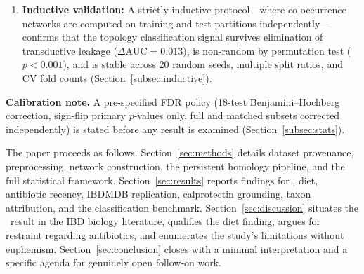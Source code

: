 \begin{enumerate}[leftmargin=*, itemsep=3pt]
  \item \textbf{Inductive validation:} A strictly inductive protocol---where
  co-occurrence networks are computed on training and test partitions
  independently---confirms that the topology classification signal survives
  elimination of transductive leakage ($\Delta\text{AUC} = 0.013$), is
  non-random by permutation test ($p < 0.001$), and is stable across 20
  random seeds, multiple split ratios, and CV fold counts
  (Section~\ref{subsec:inductive}).
\end{enumerate}

\noindent
\textbf{Calibration note.} A pre-specified FDR policy (18-test
Benjamini--Hochberg correction, sign-flip primary $p$-values only, full and
matched subsets corrected independently) is stated before any result is
examined (Section~\ref{subsec:stats}).

The paper proceeds as follows.
Section~\ref{sec:methods} details dataset provenance, preprocessing, network
construction, the persistent homology pipeline, and the full statistical
framework.
Section~\ref{sec:results} reports findings for \ibd, diet, antibiotic recency,
IBDMDB replication, calprotectin grounding, taxon attribution, and the
classification benchmark.
Section~\ref{sec:discussion} situates the \ibd\ result in the IBD biology
literature, qualifies the diet finding, argues for restraint regarding
antibiotics, and enumerates the study's limitations without euphemism.
Section~\ref{sec:conclusion} closes with a minimal interpretation and a
specific agenda for genuinely open follow-on work.

